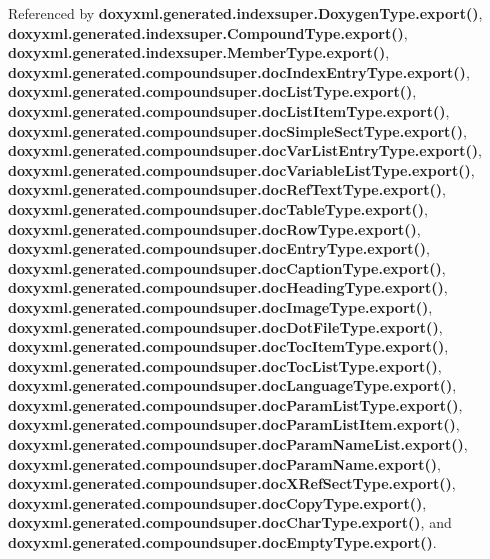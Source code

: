 Referenced by {\bf doxyxml.\+generated.\+indexsuper.\+Doxygen\+Type.\+export()}, {\bf doxyxml.\+generated.\+indexsuper.\+Compound\+Type.\+export()}, {\bf doxyxml.\+generated.\+indexsuper.\+Member\+Type.\+export()}, {\bf doxyxml.\+generated.\+compoundsuper.\+doc\+Index\+Entry\+Type.\+export()}, {\bf doxyxml.\+generated.\+compoundsuper.\+doc\+List\+Type.\+export()}, {\bf doxyxml.\+generated.\+compoundsuper.\+doc\+List\+Item\+Type.\+export()}, {\bf doxyxml.\+generated.\+compoundsuper.\+doc\+Simple\+Sect\+Type.\+export()}, {\bf doxyxml.\+generated.\+compoundsuper.\+doc\+Var\+List\+Entry\+Type.\+export()}, {\bf doxyxml.\+generated.\+compoundsuper.\+doc\+Variable\+List\+Type.\+export()}, {\bf doxyxml.\+generated.\+compoundsuper.\+doc\+Ref\+Text\+Type.\+export()}, {\bf doxyxml.\+generated.\+compoundsuper.\+doc\+Table\+Type.\+export()}, {\bf doxyxml.\+generated.\+compoundsuper.\+doc\+Row\+Type.\+export()}, {\bf doxyxml.\+generated.\+compoundsuper.\+doc\+Entry\+Type.\+export()}, {\bf doxyxml.\+generated.\+compoundsuper.\+doc\+Caption\+Type.\+export()}, {\bf doxyxml.\+generated.\+compoundsuper.\+doc\+Heading\+Type.\+export()}, {\bf doxyxml.\+generated.\+compoundsuper.\+doc\+Image\+Type.\+export()}, {\bf doxyxml.\+generated.\+compoundsuper.\+doc\+Dot\+File\+Type.\+export()}, {\bf doxyxml.\+generated.\+compoundsuper.\+doc\+Toc\+Item\+Type.\+export()}, {\bf doxyxml.\+generated.\+compoundsuper.\+doc\+Toc\+List\+Type.\+export()}, {\bf doxyxml.\+generated.\+compoundsuper.\+doc\+Language\+Type.\+export()}, {\bf doxyxml.\+generated.\+compoundsuper.\+doc\+Param\+List\+Type.\+export()}, {\bf doxyxml.\+generated.\+compoundsuper.\+doc\+Param\+List\+Item.\+export()}, {\bf doxyxml.\+generated.\+compoundsuper.\+doc\+Param\+Name\+List.\+export()}, {\bf doxyxml.\+generated.\+compoundsuper.\+doc\+Param\+Name.\+export()}, {\bf doxyxml.\+generated.\+compoundsuper.\+doc\+X\+Ref\+Sect\+Type.\+export()}, {\bf doxyxml.\+generated.\+compoundsuper.\+doc\+Copy\+Type.\+export()}, {\bf doxyxml.\+generated.\+compoundsuper.\+doc\+Char\+Type.\+export()}, and {\bf doxyxml.\+generated.\+compoundsuper.\+doc\+Empty\+Type.\+export()}.



